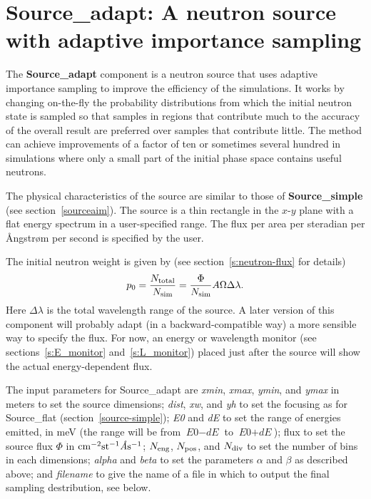\section{Source\_adapt: A neutron source with adaptive importance sampling}
\label{s:Source_adapt}
\label{s:source-adapt}


The {\bf Source\_adapt} component is a neutron source that uses adaptive
importance sampling to improve the efficiency of the simulations. It
works by changing on-the-fly the probability distributions from which
the initial neutron state is sampled so that samples in regions that
contribute much to the accuracy of the overall result are preferred over
samples that contribute little. The method can achieve improvements of a
factor of ten or sometimes several hundred in simulations where only a
small part of the initial phase space contains useful neutrons.

The physical characteristics of the source are similar to those of
{\bf Source\_simple} (see section~\ref{sourceaim}). The source is a thin
rectangle in the $x$-$y$ plane with a flat energy spectrum in a
user-specified range. The flux per area per steradian per
{\AA}ngstr{\o}m per second is specified by the user.

The initial neutron weight is given by
(see section~\ref{s:neutron-flux} for details)
\begin{equation}
    p_0 = \frac{N_{\rm total}}{N_{\rm sim}} =
    \frac{\Phi}{N_{\rm sim}} A \Omega \Delta\lambda .
\end{equation}
Here $\Delta\lambda$ is the total wavelength range of the source.
A later version of
this component will probably adapt (in a backward-compatible way) a more
sensible way to specify the flux. For now, an energy or wavelength
monitor (see sections~\ref{s:E_monitor} and~\ref{s:L_monitor}) placed
just after the source will show the actual energy-dependent flux.

The input parameters for Source\_adapt are
\textit{xmin}, \textit{xmax}, \textit{ymin}, and
\textit{ymax} in meters to set the source dimensions;
\textit{dist}, \textit{xw}, and \textit{yh}
to set the focusing as for Source\_flat (section~\ref{source-simple});
\textit{E0} and \textit{dE} to set the range of energies emitted, in meV (the range
will be from $\textit{E0} - \textit{dE}$ to
$\textit{E0} + \textit{dE}$);
flux to set the source flux $\Phi$ in ${\rm
  cm}^{-2} {\rm st}^{-1} \textit{\AA} {\rm s}^{-1}$;
$N_{\rm eng}$, $N_{\rm pos}$, and $N_{\rm
  div}$ to set the number of bins in each dimensions; \textit{alpha} and
\textit{beta} to set the parameters $\alpha$ and $\beta$ as described
above; and \textit{filename} to give the name of a file in which to
output the final sampling destribution, see below.

